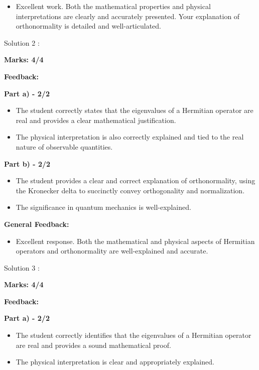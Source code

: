 \documentclass[a4paper,11pt]{article}
\begin{document}
\begin{itemize}
    \item Excellent work. Both the mathematical properties and physical interpretations are clearly and accurately presented. Your explanation of orthonormality is detailed and well-articulated.
\end{itemize}


Solution 2 :

\textbf{Marks: 4/4}

\textbf{Feedback:}

\textbf{Part a) - 2/2}

\begin{itemize}
    \item The student correctly states that the eigenvalues of a Hermitian operator are real and provides a clear mathematical justification.
    \item The physical interpretation is also correctly explained and tied to the real nature of observable quantities.
\end{itemize}

\textbf{Part b) - 2/2}

\begin{itemize}
    \item The student provides a clear and correct explanation of orthonormality, using the Kronecker delta to succinctly convey orthogonality and normalization.
    \item The significance in quantum mechanics is well-explained.
\end{itemize}

\textbf{General Feedback:}

\begin{itemize}
    \item Excellent response. Both the mathematical and physical aspects of Hermitian operators and orthonormality are well-explained and accurate.
\end{itemize}


Solution 3 :

\textbf{Marks: 4/4}

\textbf{Feedback:}

\textbf{Part a) - 2/2}

\begin{itemize}
    \item The student correctly identifies that the eigenvalues of a Hermitian operator are real and provides a sound mathematical proof.
    \item The physical interpretation is clear and appropriately explained.
\end{itemize}
\end{document}
